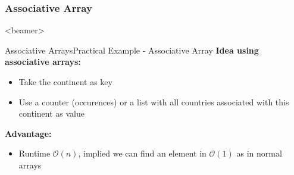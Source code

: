 \subsubsection{Associative Array}

\begin{frame}<beamer>{\LectureToC}
\end{frame}

\begin{frame}{Associative Arrays}{Practical Example - Associative Array}
  \textbf{Idea using associative arrays:}
  \begin{itemize}
    \item
      Take the continent as {\color{Mittel-Blau}key}
    \item
      Use a counter (occurences) or a list with all countries associated
      with this continent as {\color{Mittel-Blau}value}
  \end{itemize}
  \textbf{Advantage:}
  \begin{itemize}
    \item
      Runtime $\mathcal{O}(n)$, implied we can find an element in 
      $\mathcal{O}(1)$ as in normal arrays
  \end{itemize}
\end{frame}






